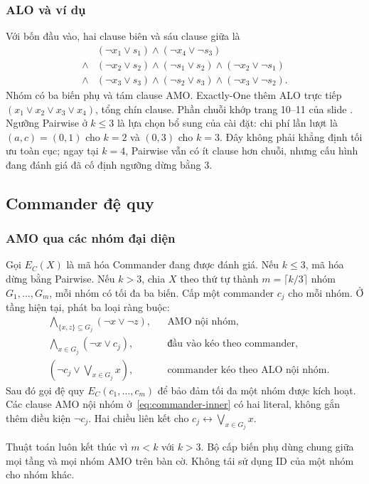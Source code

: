 \subsubsection{ALO và ví dụ}
Với bốn đầu vào, hai clause biên và sáu clause giữa là
\begin{align*}
&(\neg x_1\lor s_1)\land(\neg x_4\lor\neg s_3)\\
{}\land{}&(\neg x_2\lor s_2)\land(\neg s_1\lor s_2)
\land(\neg x_2\lor\neg s_1)\\
{}\land{}&(\neg x_3\lor s_3)\land(\neg s_2\lor s_3)
\land(\neg x_3\lor\neg s_2).
\end{align*}
Nhóm có ba biến phụ và tám clause AMO. Exactly-One thêm ALO trực tiếp $(x_1\lor x_2\lor x_3\lor x_4)$, tổng chín clause. Phần chuỗi khớp trang 10--11 của slide \citep{amoSlides}. Ngưỡng Pairwise ở $k\le3$ là lựa chọn bổ sung của cài đặt: chi phí lần lượt là $(a,c)=(0,1)$ cho $k=2$ và $(0,3)$ cho $k=3$. Đây không phải khẳng định tối ưu toàn cục; ngay tại $k=4$, Pairwise vẫn có ít clause hơn chuỗi, nhưng cấu hình đang đánh giá đã cố định ngưỡng dừng bằng 3.

\subsection{Commander đệ quy}
\label{sec:commander}
\subsubsection{AMO qua các nhóm đại diện}
Gọi $E_C(X)$ là mã hóa Commander đang được đánh giá. Nếu $k\le3$, mã hóa dừng bằng Pairwise. Nếu $k>3$, chia $X$ theo thứ tự thành $m=\lceil k/3\rceil$ nhóm $G_1,\ldots,G_m$, mỗi nhóm có tối đa ba biến. Cấp một commander $c_j$ cho mỗi nhóm. Ở tầng hiện tại, phát ba loại ràng buộc:
\begin{align}
&\bigwedge_{\{x,z\}\subseteq G_j}(\neg x\lor\neg z),
&&\text{AMO nội nhóm},\label{eq:commander-inner}\\
&\bigwedge_{x\in G_j}(\neg x\lor c_j),
&&\text{đầu vào kéo theo commander},\\
&\left(\neg c_j\lor\bigvee_{x\in G_j}x\right),
&&\text{commander kéo theo ALO nội nhóm}.
\end{align}
Sau đó gọi đệ quy $E_C(c_1,\ldots,c_m)$ để bảo đảm tối đa một nhóm được kích hoạt. Các clause AMO nội nhóm ở~\eqref{eq:commander-inner} có hai literal, không gắn thêm điều kiện $\neg c_j$. Hai chiều liên kết cho $c_j\leftrightarrow\bigvee_{x\in G_j}x$.

Thuật toán luôn kết thúc vì $m<k$ với $k>3$. Bộ cấp biến phụ dùng chung giữa mọi tầng và mọi nhóm AMO trên bàn cờ. Không tái sử dụng ID của một nhóm cho nhóm khác.

